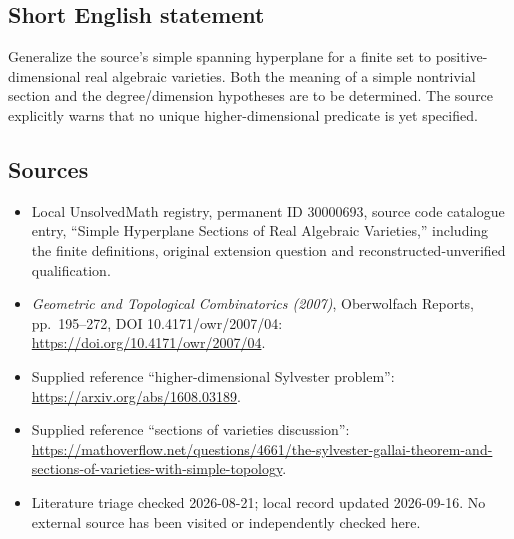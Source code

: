 \documentclass[11pt]{article}
\begin{document}
\subsection{Short English statement}
Generalize the source's simple spanning hyperplane for a finite set to positive-dimensional real algebraic varieties. Both the meaning of a simple nontrivial section and the degree/dimension hypotheses are to be determined. The source explicitly warns that no unique higher-dimensional predicate is yet specified.
\subsection{Sources}
\begin{itemize}
\item Local UnsolvedMath registry, permanent ID 30000693, source code catalogue entry, ``Simple Hyperplane Sections of Real Algebraic Varieties,'' including the finite definitions, original extension question and reconstructed-unverified qualification.
\item \emph{Geometric and Topological Combinatorics (2007)}, Oberwolfach Reports, pp.\ 195--272, DOI 10.4171/owr/2007/04: \url{https://doi.org/10.4171/owr/2007/04}.
\item Supplied reference ``higher-dimensional Sylvester problem'': \url{https://arxiv.org/abs/1608.03189}.
\item Supplied reference ``sections of varieties discussion'': \url{https://mathoverflow.net/questions/4661/the-sylvester-gallai-theorem-and-sections-of-varieties-with-simple-topology}.
\item Literature triage checked 2026-08-21; local record updated 2026-09-16. No external source has been visited or independently checked here.
\end{itemize}
\end{document}
